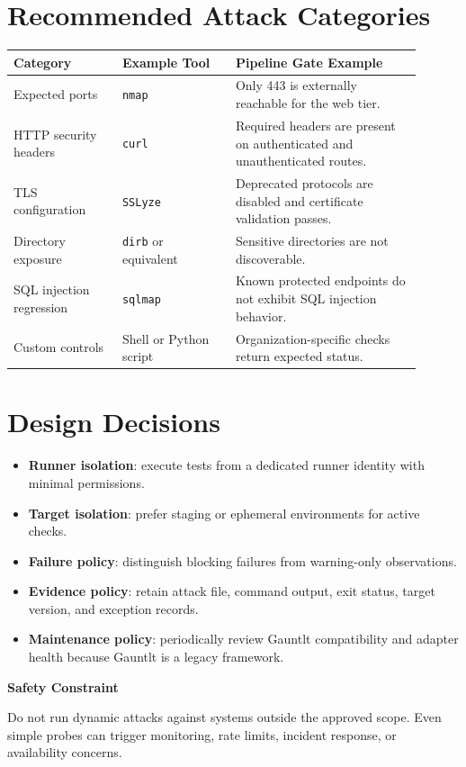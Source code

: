 \documentclass[11pt]{article}
\newenvironment{RiskBox}[1]{%
  \par\vspace{0.3em}\noindent\begin{lrbox}{\gauntltbox}\begin{minipage}{0.96\linewidth}\textbf{#1}\par\smallskip}
  {\end{minipage}\end{lrbox}\fcolorbox{RuleGray}{RiskAmber}{\usebox{\gauntltbox}}\par\vspace{0.4em}}
\begin{document}
\section{Recommended Attack Categories}
\begin{longtable}{@{}L{0.24\linewidth}L{0.25\linewidth}L{0.41\linewidth}@{}}
\toprule
\textbf{Category} & \textbf{Example Tool} & \textbf{Pipeline Gate Example} \\
\midrule
Expected ports & \texttt{nmap} & Only 443 is externally reachable for the web tier. \\
HTTP security headers & \texttt{curl} & Required headers are present on authenticated and unauthenticated routes. \\
TLS configuration & \texttt{SSLyze} & Deprecated protocols are disabled and certificate validation passes. \\
Directory exposure & \texttt{dirb} or equivalent & Sensitive directories are not discoverable. \\
SQL injection regression & \texttt{sqlmap} & Known protected endpoints do not exhibit SQL injection behavior. \\
Custom controls & Shell or Python script & Organization-specific checks return expected status. \\
\bottomrule
\end{longtable}

\section{Design Decisions}
\begin{itemize}
  \item \textbf{Runner isolation}: execute tests from a dedicated runner identity with minimal permissions.
  \item \textbf{Target isolation}: prefer staging or ephemeral environments for active checks.
  \item \textbf{Failure policy}: distinguish blocking failures from warning-only observations.
  \item \textbf{Evidence policy}: retain attack file, command output, exit status, target version, and exception records.
  \item \textbf{Maintenance policy}: periodically review Gauntlt compatibility and adapter health because Gauntlt is a legacy framework.
\end{itemize}

\begin{RiskBox}{Safety Constraint}
Do not run dynamic attacks against systems outside the approved scope. Even simple probes can trigger monitoring, rate limits, incident response, or availability concerns.
\end{RiskBox}
\end{document}

